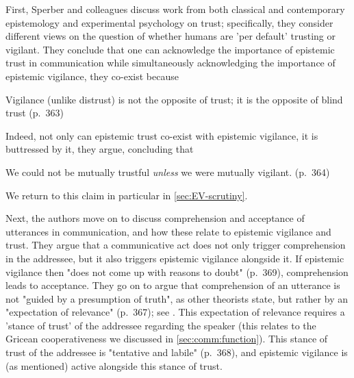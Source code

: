 First, Sperber and colleagues discuss work from both classical and contemporary epistemology and experimental psychology on trust; specifically, they consider different views on the question of whether humans are 'per default' trusting or vigilant. They conclude that one can acknowledge the importance of epistemic trust in communication while simultaneously acknowledging the importance of epistemic vigilance, they co-exist because
\begin{quoting}
    Vigilance (unlike distrust) is not the opposite of trust; it is the opposite
of blind trust
    \hfill (p.~363)
\end{quoting}
Indeed, not only can epistemic trust co-exist with epistemic vigilance, it is buttressed by it, they argue, concluding that
\begin{quoting}
    We could not be mutually trustful \emph{unless} we were mutually vigilant.
    \hfill (p.~364)
\end{quoting}
We return to this claim in particular in \cref{sec:EV-scrutiny}.

Next, the authors move on to discuss comprehension and acceptance of utterances in communication, and how these relate to epistemic vigilance and trust.
They argue that a communicative act does not only trigger comprehension in the addressee, but it also triggers epistemic vigilance alongside it. If epistemic vigilance then "does not come up with reasons to doubt" (p.~369), comprehension leads to acceptance.
They go on to argue that comprehension of an utterance is not "guided by a presumption of truth", as other theorists state, but rather by an "expectation of relevance" (p.~367); see \citet{SperberWilson86}. This expectation of relevance requires a 'stance of trust' of the addressee regarding the speaker (this relates to the Gricean cooperativeness we discussed in \cref{sec:comm:function}).
This stance of trust of the addressee is "tentative and labile" (p.~368), and epistemic vigilance is (as mentioned) active alongside this stance of trust.



